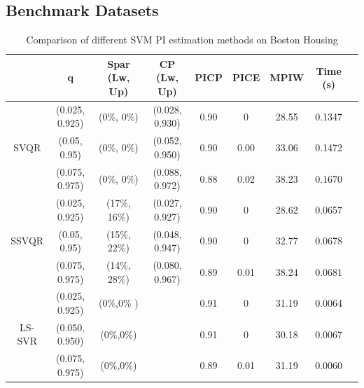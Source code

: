 \documentclass[10pt]{article} %
\begin{document}
\subsection{Benchmark Datasets}

\begin{table}[htp]
    \centering
    {\fontsize{9}{10} \selectfont
    \begin{tabular}{|c|c|c|c|c|c|c|c|c|}
    \hline
      &  q & Spar (Lw, Up) & CP (Lw, Up) & PICP & PICE & MPIW & Time (s) \\ \hline
    \multirow{3}{*}{SVQR}   & (0.025, 0.925) & (0\%, 0\%) & (0.028, 0.930) & 0.90 & 0 & 28.55 & 0.1347 \\
       & (0.05, 0.95) & (0\%, 0\%) & (0.052, 0.950) & 0.90 & 0.00 & 33.06 & 0.1472 \\
     &   (0.075, 0.975) & (0\%, 0\%) & (0.088, 0.972) & 0.88 & 0.02 & 38.23 & 0.1670 \\  \hline
     \multirow{3}{*}{SSVQR}  & (0.025, 0.925) & (17\%, 16\%) & (0.027, 0.927) & 0.90 & 0  & 28.62 & 0.0657 \\ 
      &  (0.05, 0.95) & (15\%, 22\%) & (0.048, 0.947) & 0.90 & 0 & 32.77 & 0.0678 \\ 
     &   (0.075, 0.975) & (14\%, 28\%) & (0.080, 0.967) & 0.89 & 0.01 & 38.24 & 0.0681 \\ \hline
      \multirow{3}{*}{LS-SVR} &  (0.025, 0.925) & (0\%,0\% )&  & 0.91 & 0 & 31.19 & 0.0064 \\ 
     &(0.050, 0.950) & (0\%,0\%) &  & 0.91 & 0 & 30.18 & 0.0067 \\
        
    & (0.075, 0.975) & (0\%,0\%) &  &0.89 & 0.01 & 31.19 & 0.0060 \\ \hline
    \end{tabular}}
    \caption{Comparison of different SVM PI estimation methods on Boston Housing}
    \label{BS}
\end{table}
\end{document}
